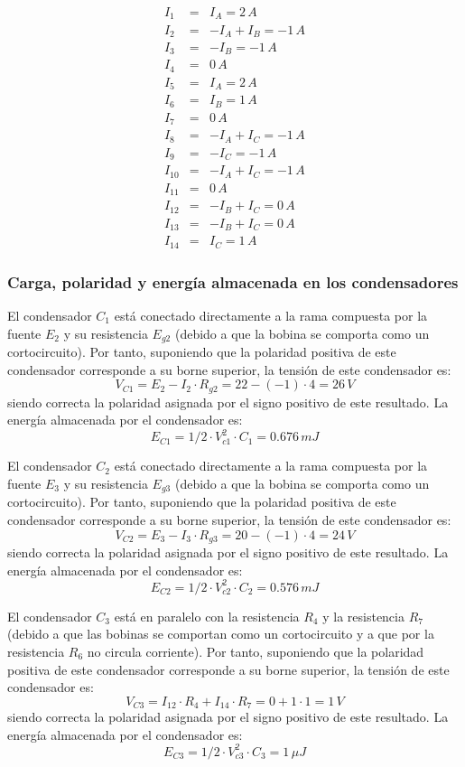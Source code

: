 \documentclass[10pt]{article}
\begin{document}
\begin{eqnarray*}
I_{1} & = & I_{A}=2\, A\\
I_{2} & = & -I_{A}+I_{B}=-1\, A\\
I_{3} & = & -I_{B}=-1\, A\\
I_{4} & = & 0\, A\\
I_{5} & = & I_{A}=2\, A\\
I_{6} & = & I_{B}=1\, A\\
I_{7} & = & 0\, A\\
I_{8} & = & -I_{A}+I_{C}=-1\, A\\
I_{9} & = & -I_{C}=-1\, A\\
I_{10} & = & -I_{A}+I_{C}=-1\, A\\
I_{11} & = & 0\, A\\
I_{12} & = & -I_{B}+I_{C}=0\, A\\
I_{13} & = & -I_{B}+I_{C}=0\, A\\
I_{14} & = & I_{C}=1\, A
\end{eqnarray*}



\subsubsection*{Carga, polaridad y energía almacenada en los condensadores}


El condensador $C_{1}$ está conectado directamente a la rama compuesta
por la fuente $E_{2}$ y su resistencia $E_{g2}$ (debido a que la
bobina se comporta como un cortocircuito). Por tanto, suponiendo que
la polaridad positiva de este condensador corresponde a su borne superior,
la tensión de este condensador es:
\[
V_{C1}=E_{2}-I_{2}\cdot R_{g2}=22-(-1)\cdot4=26\, V
\]
siendo correcta la polaridad asignada por el signo positivo de este
resultado. La energía almacenada por el condensador es:
\[
E_{C1}=1/2\cdot V_{c1}^{2}\cdot C_{1}=0.676\, mJ
\]

El condensador $C_{2}$ está conectado directamente a la rama compuesta
por la fuente $E_{3}$ y su resistencia $E_{g3}$ (debido a que la
bobina se comporta como un cortocircuito). Por tanto, suponiendo que
la polaridad positiva de este condensador corresponde a su borne superior,
la tensión de este condensador es:
\[
V_{C2}=E_{3}-I_{3}\cdot R_{g3}=20-(-1)\cdot4=24\, V
\]
siendo correcta la polaridad asignada por el signo positivo de este
resultado. La energía almacenada por el condensador es:
\[
E_{C2}=1/2\cdot V_{c2}^{2}\cdot C_{2}=0.576\, mJ
\]


El condensador $C_{3}$ está en paralelo con la resistencia $R_{4}$
y la resistencia $R_{7}$ (debido a que las bobinas se comportan como
un cortocircuito y a que por la resistencia $R_{6}$ no circula corriente).
Por tanto, suponiendo que la polaridad positiva de este condensador
corresponde a su borne superior, la tensión de este condensador es:
\[
V_{C3}=I_{12}\cdot R_{4}+I_{14}\cdot R_{7}=0+1\cdot1=1\, V
\]
siendo correcta la polaridad asignada por el signo positivo de este
resultado. La energía almacenada por el condensador es:
\[
E_{C3}=1/2\cdot V_{c3}^{2}\cdot C_{3}=1\,\mu J
\]
\end{document}
